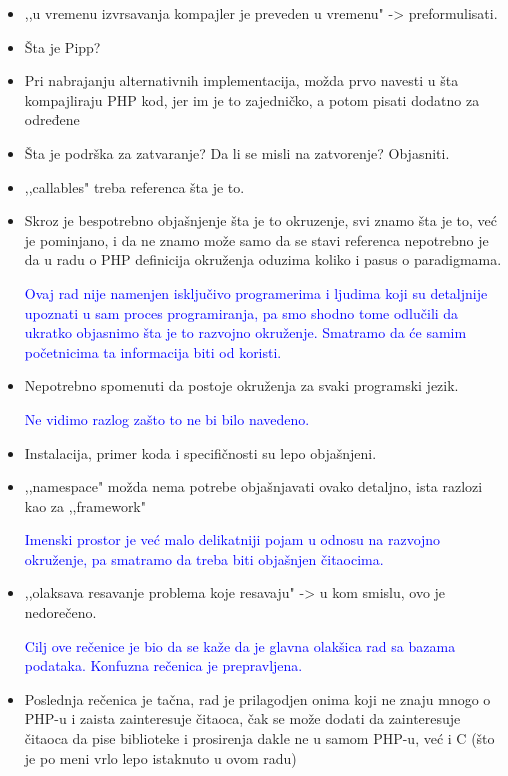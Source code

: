 \documentclass[a4paper]{report}
\newcommand{\odgovor}[1]{\textcolor{blue}{#1}}
\begin{document}
\begin{itemize}
\odgovor{}

\item ,,u vremenu izvrsavanja kompajler je preveden u vremenu" -> preformulisati.

\odgovor{}

\item Šta je Pipp?

\odgovor{}

\item Pri nabrajanju alternativnih implementacija, možda prvo navesti u šta kompajliraju PHP kod, jer im je to zajedničko, a potom pisati dodatno za određene

\odgovor{}

\item Šta je podrška za zatvaranje? Da li se misli na zatvorenje? Objasniti.

\odgovor{}

\item ,,callables" treba referenca šta je to.

\odgovor{}

\item Skroz je bespotrebno objašnjenje šta je to okruzenje, svi znamo šta je to, već je pominjano, i da ne znamo može samo da se stavi referenca nepotrebno je da u radu o PHP definicija okruženja oduzima koliko i pasus o paradigmama.

\odgovor{Ovaj rad nije namenjen isključivo programerima i ljudima koji su detaljnije upoznati u sam proces programiranja, pa smo shodno tome odlučili da ukratko objasnimo šta je to razvojno okruženje. Smatramo da će samim početnicima ta informacija biti od koristi.}

\item Nepotrebno spomenuti da postoje okruženja za svaki programski jezik.

\odgovor{Ne vidimo razlog zašto to ne bi bilo navedeno.}

\item Instalacija, primer koda i specifičnosti su lepo objašnjeni.

\item ,,namespace" možda nema potrebe objašnjavati ovako detaljno, ista razlozi kao za ,,framework"

\odgovor{Imenski prostor je već malo delikatniji pojam u odnosu na razvojno okruženje, pa smatramo da treba biti objašnjen čitaocima. }

\item ,,olaksava resavanje problema koje resavaju" -> u kom smislu, ovo je nedorečeno.

\odgovor{Cilj ove rečenice je bio da se kaže da je glavna olakšica rad sa bazama podataka. Konfuzna rečenica je prepravljena.}

\item Poslednja rečenica je tačna, rad je prilagodjen onima koji ne znaju mnogo o PHP-u i zaista zainteresuje čitaoca, čak se može dodati da zainteresuje čitaoca da pise biblioteke i prosirenja dakle ne u samom PHP-u, već i C (što je po meni vrlo lepo istaknuto u ovom radu)
\end{itemize}
\end{document}
